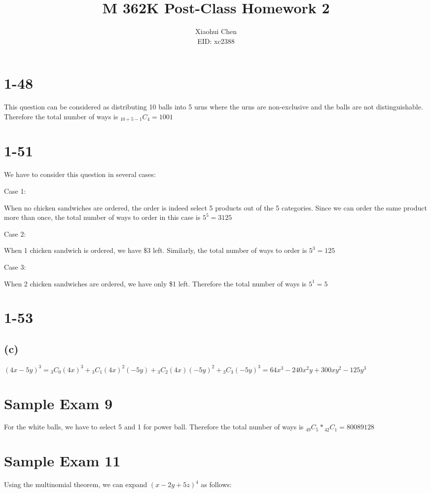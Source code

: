 \documentclass[12pt]{article}
\author{Xiaohui Chen \\EID: xc2388}
\title{M 362K Post-Class Homework 2}
\begin{document}
\maketitle
\begin{spacing}{2.0}

\section*{1-48}
This question can be considered as distributing 10 balls into 5 urns where the urns are non-exclusive and the balls are not distinguishable. Therefore the total number of ways is ${}_{10+5-1}C_{4}=1001$

\section*{1-51}
We have to consider this question in several cases:

Case 1:

When no chicken sandwiches are ordered, the order is indeed select 5 products out of the 5 categories. Since we can order the same product more than once, the total number of ways to order in this case is $5^5=3125$

Case 2:

When 1 chicken sandwich is ordered, we have \$3 left. Similarly, the total number of ways to order is $5^3=125$

Case 3:

When 2 chicken sandwiches are ordered, we have only \$1 left. Therefore the total number of ways is $5^1=5$

\section*{1-53}
\subsection*{(c)}
$(4x-5y)^3 = {}_{3}C_{0} (4x)^3 + {}_{3}C_{1} (4x)^2(-5y) + {}_{3}C_{2} (4x)(-5y)^2 + {}_{3}C_{3} (-5y)^3 = 64x^3 - 240x^2y + 300xy^2 - 125y^3$

\section*{Sample Exam 9}
For the white balls, we have to select 5 and 1 for power ball. Therefore the total number of ways is ${}_{49}C_{5}*{}_{42}C_{1}=80089128$

\section*{Sample Exam 11}
Using the multinomial theorem, we can expand $(x-2y+5z)^4$ as follows:


\end{spacing}
\end{document}
